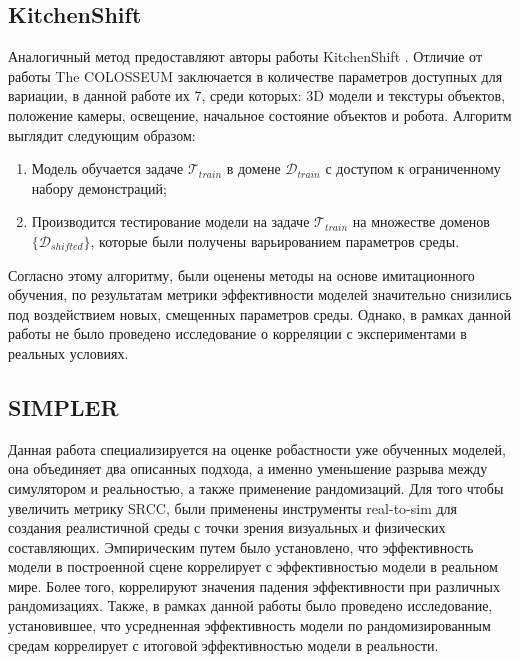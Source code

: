         \subsection{KitchenShift}
            Аналогичный метод предоставляют авторы работы KitchenShift \cite{xing2021kitchenshift}. Отличие от работы The COLOSSEUM заключается в количестве параметров доступных для вариации, в данной работе их 7, среди которых: 3D модели и текстуры объектов, положение камеры, освещение, начальное состояние объектов и робота. Алгоритм выглядит следующим образом:
    
            \begin{enumerate}
                \item Модель обучается задаче $\mathcal{T}_{train}$ в домене $\mathcal{D}_{train}$ с доступом к ограниченному набору демонстраций;
                \item Производится тестирование модели на задаче $\mathcal{T}_{train}$ на множестве доменов $\{\mathcal{D}_{shifted}\}$, которые были получены варьированием параметров среды.
            \end{enumerate}
    
        Согласно этому алгоритму, были оценены методы на основе имитационного обучения, по результатам метрики эффективности моделей значительно снизились под воздействием новых, смещенных параметров среды. Однако, в рамках данной работы не было проведено исследование о корреляции с экспериментами в реальных условиях.
    
        \subsection{SIMPLER}
    
            Данная работа \cite{li24simpler} специализируется на оценке робастности уже обученных моделей, она объединяет два описанных подхода, а именно уменьшение разрыва между симулятором и реальностью, а также применение рандомизаций. Для того чтобы увеличить метрику SRCC, были применены инструменты real-to-sim для создания реалистичной среды с точки зрения визуальных и физических составляющих. Эмпирическим путем было установлено, что эффективность модели в построенной сцене коррелирует с эффективностью модели в реальном мире. Более того, коррелируют значения падения эффективности при различных рандомизациях. Также, в рамках данной работы было проведено исследование, установившее, что усредненная эффективность модели по рандомизированным средам коррелирует с итоговой эффективностью модели в реальности. 
    

